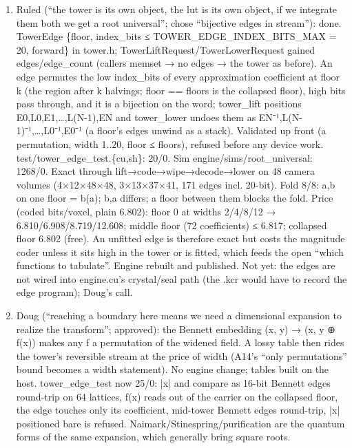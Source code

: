 \begin{enumerate}
\item Ruled (“the tower is its own object, the lut is its own object, if we integrate them both we get a root universal”; chose “bijective edges in stream”): done. TowerEdge \{floor, index\_\allowbreak{}bits ≤ TOWER\_\allowbreak{}EDGE\_\allowbreak{}INDEX\_\allowbreak{}BITS\_\allowbreak{}MAX = 20, forward\} in tower.h; TowerLiftRequest/TowerLowerRequest gained edges/edge\_\allowbreak{}count (callers memset → no edges → the tower as before). An edge permutes the low index\_\allowbreak{}bits of every approximation coefficient at floor k (the region after k halvings; floor == floors is the collapsed floor), high bits pass through, and it is a bijection on the word; tower\_\allowbreak{}lift positions E0,L0,E1,…,L(N-1),EN and tower\_\allowbreak{}lower undoes them as EN⁻¹,L(N-1)⁻¹,…,L0⁻¹,E0⁻¹ (a floor's edges unwind as a stack). Validated up front (a permutation, width 1..20, floor ≤ floors), refused before any device work. test/tower\_\allowbreak{}edge\_\allowbreak{}test.\{cu,sh\}: 20/0. Sim engine/sims/root\_\allowbreak{}universal: 1268/0. Exact through lift→code→wipe→decode→lower on 48 camera volumes (4×12×48×48, 3×13×37×41, 171 edges incl. 20-bit). Fold 8/8: a,b on one floor = b(a); b,a differs; a floor between them blocks the fold. Price (coded bits/voxel, plain 6.802): floor 0 at widths 2/4/8/12 → 6.810/6.908/8.719/12.608; middle floor (72 coefficients) ≤ 6.817; collapsed floor 6.802 (free). An unfitted edge is therefore exact but costs the magnitude coder unless it sits high in the tower or is fitted, which feeds the open “which functions to tabulate”. Engine rebuilt and published. Not yet: the edges are not wired into engine.cu's crystal/seal path (the .kcr would have to record the edge program); Doug's call.
\item Doug (“reaching a boundary here means we need a dimensional expansion to realize the transform”; approved): the Bennett embedding (x, y) → (x, y ⊕ f(x)) makes any f a permutation of the widened field. A lossy table then rides the tower's reversible stream at the price of width (A14's “only permutations” bound becomes a width statement). No engine change; tables built on the host. tower\_\allowbreak{}edge\_\allowbreak{}test now 25/0: |x| and compare as 16-bit Bennett edges round-trip on 64 lattices, f(x) reads out of the carrier on the collapsed floor, the edge touches only its coefficient, mid-tower Bennett edges round-trip, |x| positioned bare is refused. Naimark/Stinespring/purification are the quantum forms of the same expansion, which generally bring square roots.

\end{enumerate}
